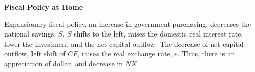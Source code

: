 \documentclass[12pt]{article}
\begin{document}
\begin{figure}[H]
\end{figure}



{\textbf {Fiscal Policy at Home}}

Expansionary fiscal policy, an increase in government purchasing, decreases the
national savings, $ S $. $ S $ shifts to the left, raises the domestic real interest
rate, lower the investment and the net capital outflow.
The decrease of net capital outflow, left shift of $ CF $, raises the real exchange
rate, $ \varepsilon $. Thus, there is an appreciation of dollar, and decrease in 
$ NX $.

\begin{figure}[H]
\end{figure}
\end{document}
